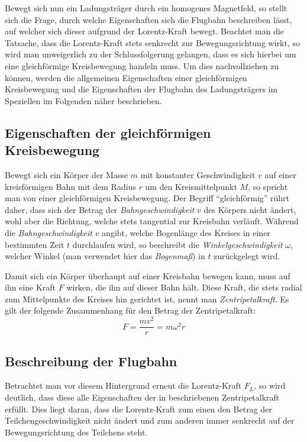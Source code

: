 Bewegt sich nun ein Ladungstr\"ager durch ein homogenes Magnetfeld, so stellt sich die Frage, durch welche Eigenschaften sich
die Flugbahn beschreiben l\"asst, auf welcher sich dieser aufgrund der Lorentz-Kraft bewegt. Beachtet man die Tatsache, dass die
Lorentz-Kraft stets senkrecht zur Bewegungsrichtung wirkt, so wird man unweigerlich zu der Schlussfolgerung gelangen, dass es sich
hierbei um eine gleichf\"ormige Kreisbewegung handeln muss. Um dies nachvollziehen zu k\"onnen, werden die allgemeinen Eigenschaften
einer gleichf\"ormigen Kreisbewegung und die Eigenschaften der Flugbahn des Ladungstr\"agers im Speziellen im Folgenden n\"aher
beschrieben.

\subsection{Eigenschaften der gleichf\"ormigen Kreisbewegung}
\label{sec:kreisbewegung}

Bewegt sich ein K\"orper der Masse \(m\) mit konstanter Geschwindigkeit \(v\) auf einer kreisf\"ormigen Bahn mit dem Radius \(r\) um den
Kreismittelpunkt \(M\), so spricht man von einer gleichf\"ormigen Kreisbewegung. Der Begriff "`gleichf\"ormig"' r\"uhrt daher,
dass sich der Betrag der \textit{Bahngeschwindigkeit} \(v\) des K\"orpers nicht \"andert, wohl aber die Richtung, welche stets
tangential zur Kreisbahn verl\"auft. W\"ahrend die \textit{Bahngeschwindigkeit} \(v\) angibt, welche Bogenl\"ange des Kreises in einer
bestimmten Zeit \(t\) durchlaufen wird, so beschreibt die \textit{Winkelgeschwindigkeit} \(\omega\), welcher Winkel (man verwendet hier
das \textit{Bogenma{\ss}}) in \(t\) zur\"uckgelegt wird.

Damit sich ein K\"orper \"uberhaupt auf einer Kreisbahn bewegen kann, muss auf ihn eine Kraft \(F\) wirken, die ihn auf dieser Bahn
h\"alt. Diese Kraft, die stets radial zum Mittelpunkte des Kreises hin gerichtet ist, nennt man \textit{Zentripetalkraft}.
Es gilt der folgende Zusammenhang f\"ur den Betrag der Zentripetalkraft:
\begin{equation}
\label{eq:zentripetalkraft}
F = \frac{mv^2}{r} = m\omega^2r
\end{equation}

\subsection{Beschreibung der Flugbahn}
\label{sec:flugbahnbeschreibung}

Betrachtet man vor diesem Hintergrund erneut die Lorentz-Kraft \(F_L\), so wird deutlich, dass diese alle Eigenschaften der in
 beschriebenen Zentripetalkraft erf\"ullt. Dies liegt daran, dass die Lorentz-Kraft zum einen den Betrag
der Teilchengeschwindigkeit nicht \"andert und zum anderen immer senkrecht auf der Bewegungsrichtung des Teilchens steht.


